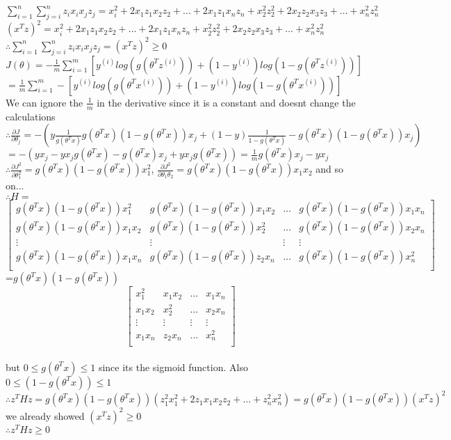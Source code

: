 \begin{answer}\\
$\sum_{i=1}^{n}\sum_{j=i}^{n}z_ix_ix_jz_j=x_i^2+2x_1z_1x_2z_2+\dots+2x_1z_1x_nz_n+x_2^2z_2^2+2x_2z_2x_3z_3+\dots+x_n^2z_n^2$\\
$(x^Tz)^2=x_i^2+2x_1z_1x_2z_2+\dots+2x_1z_1x_nz_n+x_2^2z_2^2+2x_2z_2x_3z_3+\dots+x_n^2z_n^2$\\
$\therefore \sum_{i=1}^{n}\sum_{j=i}^{n}z_ix_ix_jz_j=(x^Tz)^2 \geq 0$\\
$J(\theta)=-\frac{1}{m}\sum_{i=1}^{m}\left[ y^{(i)}log(g(\theta^T z^{(i)})) + (1-y^{(i)})log(1-g(\theta^T z^{(i)})) \right]$\\
$=\frac{1}{m}\sum_{i=1}^{m} - \left[ y^{(i)}log(g(\theta^T x^{(i)})) + (1-y^{(i)})log(1-g(\theta^T x^{(i)})) \right]$\\
We can ignore the $\frac{1}{m}$ in the derivative since it is a constant and doesnt change the calculations\\
$\therefore \frac{\partial J}{\partial \theta_j}=-(y \frac{1}{g(\theta^T x)}g(\theta^T x)(1-g(\theta^T x))x_j + (1-y)\frac{1}{1-g(\theta^T x)}-g(\theta^T x)(1-g(\theta^T x))x_j)$
$=-(yx_j-yx_jg(\theta^T x)-g(\theta^T x)x_j +yx_jg(\theta^T x))=\frac{1}{m} g(\theta^T x)x_j -yx_j$\\

$\therefore \frac{\partial J^2}{\partial \theta_1^2}=g(\theta^T x)(1-g(\theta^T x))x_1^2$, $\frac{\partial J^2}{\partial \theta_1\theta_2}=g(\theta^T x)(1-g(\theta^T x))x_1x_2$ and so on...\\
$\therefore H=$
\[
\begin{bmatrix}
g(\theta^T x)(1-g(\theta^T x))x_1^2 & g(\theta^T x)(1-g(\theta^T x))x_1x_2 & \dots & g(\theta^T x)(1-g(\theta^T x))x_1x_n \\
g(\theta^T x)(1-g(\theta^T x))x_1x_2 & g(\theta^T x)(1-g(\theta^T x))x_2^2 & \dots & g(\theta^T x)(1-g(\theta^T x))x_2x_n \\
\vdots & \vdots & \vdots  & \vdots \\
g(\theta^T x)(1-g(\theta^T x))x_1x_n & g(\theta^T x)(1-g(\theta^T x))z_2x_n & \dots & g(\theta^T x)(1-g(\theta^T x))x_n^2 \\
\end{bmatrix}
\]=$g(\theta^T x)(1-g(\theta^T x))$
\[
\begin{bmatrix}
x_1^2 & x_1x_2 & \dots & x_1x_n \\
x_1x_2 & x_2^2 & \dots & x_2x_n \\
\vdots & \vdots & \vdots  & \vdots \\
x_1x_n & z_2x_n & \dots & x_n^2 \\
\end{bmatrix}
\]\\
but $0 \leq g(\theta^T x) \leq 1$ since its the sigmoid function. Also $0 \leq (1-g(\theta^T x)) \leq1$\\
$\therefore z^THz=g(\theta^T x)(1-g(\theta^T x))(z_1^2x_1^2+2z_1x_1x_2z_2+\dots+z_n^2x_n^2)=g(\theta^T x)(1-g(\theta^T x))(x^Tz)^2$\\
we already showed $(x^Tz)^2 \geq 0$\\
$\therefore z^THz \geq 0$
\end{answer}